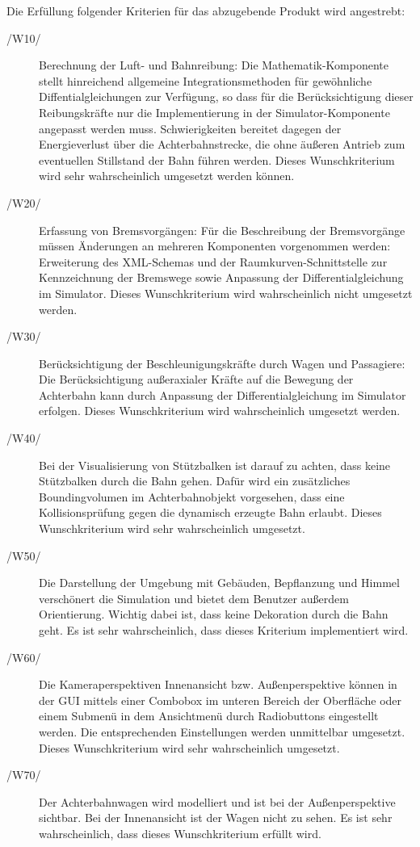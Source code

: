 Die Erfüllung folgender Kriterien für das abzugebende Produkt wird angestrebt:
\begin{description}
	\item[/W10/] Berechnung der Luft- und Bahnreibung: Die Mathematik-Komponente stellt hinreichend allgemeine Integrationsmethoden für gewöhnliche Diffentialgleichungen zur Verfügung, so dass
		     für die Berücksichtigung dieser Reibungskräfte nur die Implementierung in der Simulator-Komponente angepasst werden muss. Schwierigkeiten bereitet dagegen der Energieverlust über
		     die Achterbahnstrecke, die ohne äußeren Antrieb zum eventuellen Stillstand der Bahn führen werden. Dieses Wunschkriterium wird sehr wahrscheinlich umgesetzt werden können.
	\item[/W20/] Erfassung von Bremsvorgängen: Für die Beschreibung der Bremsvorgänge müssen Änderungen an mehreren Komponenten vorgenommen werden: Erweiterung des XML-Schemas und
		     der Raumkurven-Schnittstelle zur Kennzeichnung der Bremswege sowie Anpassung der Differentialgleichung im Simulator. Dieses Wunschkriterium wird wahrscheinlich nicht umgesetzt werden.
	\item[/W30/] Berücksichtigung der Beschleunigungskräfte durch Wagen und Passagiere: Die Berücksichtigung außeraxialer Kräfte auf die Bewegung der Achterbahn kann durch Anpassung der
                     Differentialgleichung im Simulator erfolgen. Dieses Wunschkriterium wird wahrscheinlich umgesetzt werden.
	\item[/W40/] Bei der Visualisierung von Stützbalken ist darauf zu achten, dass keine Stützbalken durch die Bahn gehen. Dafür wird ein zusätzliches Boundingvolumen im Achterbahnobjekt vorgesehen, dass eine Kollisionsprüfung gegen die dynamisch erzeugte Bahn erlaubt. Dieses Wunschkriterium wird sehr wahrscheinlich umgesetzt.
	\item[/W50/] Die Darstellung der Umgebung mit Gebäuden, Bepflanzung und Himmel verschönert die Simulation und bietet dem Benutzer außerdem Orientierung. Wichtig dabei ist, dass keine Dekoration durch die Bahn geht. Es ist sehr wahrscheinlich, dass dieses Kriterium implementiert wird.
	\item[/W60/] Die Kameraperspektiven Innenansicht bzw. Außenperspektive können in der GUI mittels einer Combobox im unteren Bereich der Oberfläche oder einem Submenü in dem Ansichtmenü durch Radiobuttons eingestellt werden. Die entsprechenden Einstellungen werden unmittelbar umgesetzt. Dieses Wunschkriterium wird sehr wahrscheinlich umgesetzt.
	\item[/W70/] Der Achterbahnwagen wird modelliert und ist bei der Außenperspektive sichtbar. Bei der Innenansicht ist der Wagen nicht zu sehen. Es ist sehr wahrscheinlich, dass dieses Wunschkriterium erfüllt wird.

\end{description}
